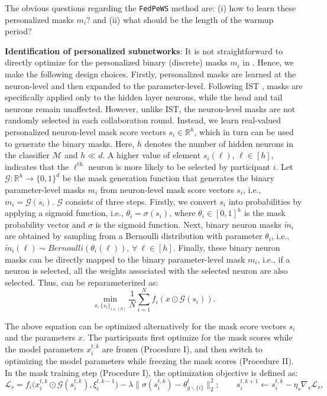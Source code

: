 \documentclass{article}
\begin{document}
The obvious questions regarding the \texttt{FedPeWS} method are: (i) how to learn these personalized masks $m_i$? and (ii) what should be the length of the warmup period?

\textbf{Identification of personalized subnetworks}: It is not straightforward to directly optimize for the personalized binary (discrete) masks $m_i$ in . Hence, we make the following design choices. Firstly, personalized masks are learned at the neuron-level and then expanded to the parameter-level. Following IST \citep{yuan2022distributed}, masks are specifically applied only to the hidden layer neurons, while the head and tail neurons remain unaffected. However, unlike IST, the neuron-level masks are not randomly selected in each collaboration round. Instead, we learn real-valued personalized neuron-level mask score vectors $s_i \in \mathbb{R}^h$, which in turn can be used to generate the binary masks. Here, $h$ denotes the number of hidden neurons in the classifier $\mathcal{M}$ and $h \ll d$. A higher value of element $s_i(\ell)$, $\ell \in [h]$, indicates that the $\ell^{\textrm{th}}$ neuron is more likely to be selected by participant $i$.  Let $\mathcal{G}:\mathbb{R}^h \rightarrow \{0,1\}^d$ be the mask generation function that generates the binary parameter-level masks $m_i$ from neuron-level mask score vectors $s_i$, i.e., $m_i = \mathcal{G}(s_i)$. $\mathcal{G}$ consists of three steps. Firstly, we convert $s_i$ into probabilities by applying a sigmoid function, i.e., $\theta_i = \sigma(s_i)$, where $\theta_i \in [0,1]^h$ is the mask probability vector and $\sigma$ is the sigmoid function. Next, binary neuron masks $\tilde{m}_i$ are obtained by sampling from a Bernoulli distribution with parameter $\theta_i$, i.e., $\tilde{m}_i(\ell) \sim Bernoulli(\theta_i(\ell))$, $\forall~\ell \in [h]$. Finally, these binary neuron masks can be directly mapped to the binary parameter-level mask $m_i$, i.e., if a neuron is selected, all the weights associated with the selected neuron are also selected. Thus,  can be reparameterized as:
\begin{equation}
    \label{eq: mask score learning}
    \min_{x, \{s_i\}_{i\in[N]}} \frac{1}{N} \sum_{i=1}^N f_i(x \odot \mathcal{G}(s_i)).
\end{equation}

The above equation can be optimized alternatively for the mask score vectors $s_i$ and the parameters $x$. The participants first optimize for the mask scores while the model parameters $x_{i}^{t,k}$ are frozen (Procedure I), and then switch to optimizing the model parameters while freezing the mask scores (Procedure II). In the mask training step (Procedure I), the optimization objective is defined as: 
\begin{equation}
    \mathcal{L}_s = f_i\Big(x_i^{t,k} \odot \mathcal{G}\left(s_i^{t,k}\right), \xi_i^{t,k-1}\Big) - \lambda \|\sigma\left(s_{i}^{t,k}\right) - \theta_{g \backslash \{i\}}^{t}\|_2^2; \qquad s_{i}^{t,k+1} \gets s_{i}^{t,k} - \eta_s \nabla_{s} \mathcal{L}_s, 
    \label{eq: mask-objective-func}
\end{equation}
\end{document}
